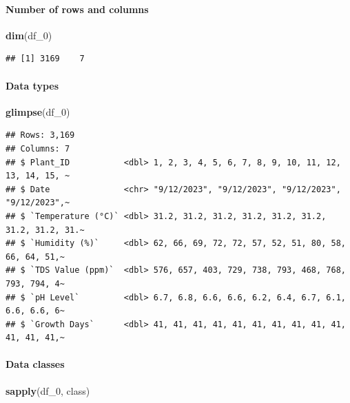 \documentclass[
]{article}
\newenvironment{Shaded}{\begin{snugshade}}{\end{snugshade}}
\newcommand{\FunctionTok}[1]{\textcolor[rgb]{0.13,0.29,0.53}{\textbf{#1}}}
\newcommand{\NormalTok}[1]{#1}
\begin{document}
\paragraph{Number of rows and columns}\label{number-of-rows-and-columns}

\begin{Shaded}
\begin{Highlighting}[]
\FunctionTok{dim}\NormalTok{(df\_0)}
\end{Highlighting}
\end{Shaded}

\begin{verbatim}
## [1] 3169    7
\end{verbatim}

\paragraph{Data types}\label{data-types}

\begin{Shaded}
\begin{Highlighting}[]
\FunctionTok{glimpse}\NormalTok{(df\_0)}
\end{Highlighting}
\end{Shaded}

\begin{verbatim}
## Rows: 3,169
## Columns: 7
## $ Plant_ID           <dbl> 1, 2, 3, 4, 5, 6, 7, 8, 9, 10, 11, 12, 13, 14, 15, ~
## $ Date               <chr> "9/12/2023", "9/12/2023", "9/12/2023", "9/12/2023",~
## $ `Temperature (°C)` <dbl> 31.2, 31.2, 31.2, 31.2, 31.2, 31.2, 31.2, 31.2, 31.~
## $ `Humidity (%)`     <dbl> 62, 66, 69, 72, 72, 57, 52, 51, 80, 58, 66, 64, 51,~
## $ `TDS Value (ppm)`  <dbl> 576, 657, 403, 729, 738, 793, 468, 768, 793, 794, 4~
## $ `pH Level`         <dbl> 6.7, 6.8, 6.6, 6.6, 6.2, 6.4, 6.7, 6.1, 6.6, 6.6, 6~
## $ `Growth Days`      <dbl> 41, 41, 41, 41, 41, 41, 41, 41, 41, 41, 41, 41, 41,~
\end{verbatim}

\paragraph{Data classes}\label{data-classes}

\begin{Shaded}
\begin{Highlighting}[]
\FunctionTok{sapply}\NormalTok{(df\_0, class)}
\end{Highlighting}
\end{Shaded}
\end{document}

